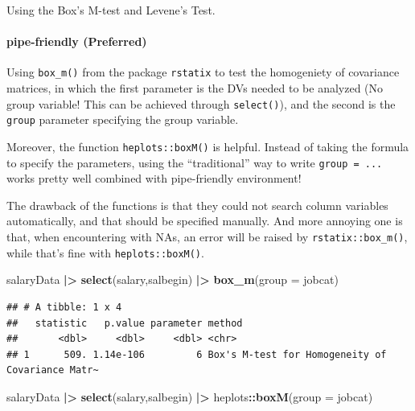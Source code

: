 \documentclass[
]{ctexart}
\newenvironment{Shaded}{\begin{snugshade}}{\end{snugshade}}
\newcommand{\AttributeTok}[1]{\textcolor[rgb]{0.13,0.29,0.53}{#1}}
\newcommand{\FunctionTok}[1]{\textcolor[rgb]{0.13,0.29,0.53}{\textbf{#1}}}
\newcommand{\NormalTok}[1]{#1}
\newcommand{\SpecialCharTok}[1]{\textcolor[rgb]{0.81,0.36,0.00}{\textbf{#1}}}
\begin{document}
Using the Box's M-test and Levene's Test.

\hypertarget{pipe-friendly-preferred-1}{%
\paragraph{pipe-friendly (Preferred)}\label{pipe-friendly-preferred-1}}

Using \texttt{box\_m()} from the package \texttt{rstatix} to test the
homogeniety of covariance matrices, in which the first parameter is the
DVs needed to be analyzed (No group variable! This can be achieved
through \texttt{select()}), and the second is the \texttt{group}
parameter specifying the group variable.

Moreover, the function \texttt{heplots::boxM()} is helpful. Instead of
taking the formula to specify the parameters, using the ``traditional''
way to write \texttt{group\ =\ ...} works pretty well combined with
pipe-friendly environment!

The drawback of the functions is that they could not search column
variables automatically, and that should be specified manually. And more
annoying one is that, when encountering with NAs, an error will be
raised by \texttt{rstatix::box\_m()}, while that's fine with
\texttt{heplots::boxM()}.

\begin{Shaded}
\begin{Highlighting}[]
\NormalTok{salaryData }\SpecialCharTok{|\textgreater{}} \FunctionTok{select}\NormalTok{(salary,salbegin) }\SpecialCharTok{|\textgreater{}} 
  \FunctionTok{box\_m}\NormalTok{(}\AttributeTok{group =}\NormalTok{ jobcat)}
\end{Highlighting}
\end{Shaded}

\begin{verbatim}
## # A tibble: 1 x 4
##   statistic   p.value parameter method                                          
##       <dbl>     <dbl>     <dbl> <chr>                                           
## 1      509. 1.14e-106         6 Box's M-test for Homogeneity of Covariance Matr~
\end{verbatim}

\begin{Shaded}
\begin{Highlighting}[]
\NormalTok{salaryData }\SpecialCharTok{|\textgreater{}} \FunctionTok{select}\NormalTok{(salary,salbegin) }\SpecialCharTok{|\textgreater{}} 
\NormalTok{  heplots}\SpecialCharTok{::}\FunctionTok{boxM}\NormalTok{(}\AttributeTok{group =}\NormalTok{ jobcat)}
\end{Highlighting}
\end{Shaded}
\end{document}
